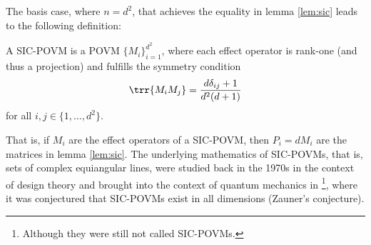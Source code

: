 The basis case, where $n=d^2$, that achieves the equality in lemma \ref{lem:sic} leads to the following definition:
\begin{definition}
A SIC-POVM is a POVM $\{M_i\}_{i=1}^{d^2}$, where each effect operator is rank-one (and thus a projection) and fulfills the symmetry condition 
\begin{align*}
    \trr{M_i M_j} = \frac{d \delta_{ij}+1}{d^2(d+1)}
\end{align*}
for all $i,j \in \{1,\dots, d^2\}$.
\end{definition}
That is, if $M_i$ are the effect operators of a SIC-POVM, then $P_i = dM_i$ are the matrices in lemma \ref{lem:sic}. 
The underlying mathematics of SIC-POVMs, that is, sets of complex equiangular lines, were studied back in the 1970s in the context of design theory \cite{Delsarte1975} and brought into the context of quantum mechanics in \cite{Zauner1999}\footnote{Although they were still not called SIC-POVMs.}, where it was conjectured that SIC-POVMs exist in all dimensions (Zauner's conjecture). 

